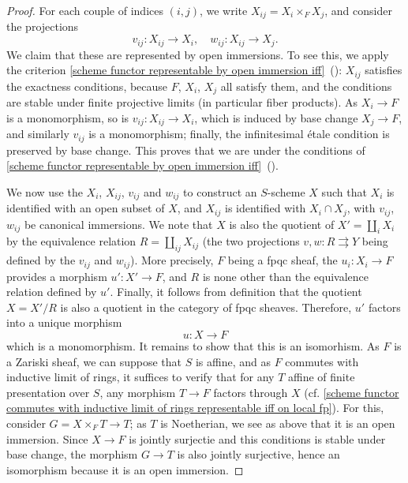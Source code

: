 \begin{proof}
For each couple of indices $(i,j)$, we write $X_{ij}=X_i\times_FX_j$, and consider the projections
\[v_{ij}:X_{ij}\to X_i,\quad w_{ij}:X_{ij}\to X_j.\]
We claim that these are represented by open immersions. To see this, we apply the criterion \cref{scheme functor representable by open immersion iff}~(): $X_{ij}$ satisfies the exactness conditions, because $F$, $X_i$, $X_j$ all satisfy them, and the conditions are stable under finite projective limits (in particular fiber products). As $X_i\to F$ is a monomorphism, so is $v_{ij}:X_{ij}\to X_i$, which is induced by base change $X_j\to F$, and similarly $v_{ij}$ is a monomorphism; finally, the infinitesimal \'etale condition is preserved by base change. This proves that we are under the conditions of \cref{scheme functor representable by open immersion iff}~().\par
We now use the $X_i$, $X_{ij}$, $v_{ij}$ and $w_{ij}$ to construct an $S$-scheme $X$ such that $X_i$ is identified with an open subset of $X$, and $X_{ij}$ is identified with $X_i\cap X_j$, with $v_{ij}$, $w_{ij}$ be canonical immersions. We note that $X$ is also the quotient of $X'=\coprod_iX_i$ by the equivalence relation $R=\coprod_{ij}X_{ij}$ (the two projections $v,w:R\rightrightarrows Y$ being defined by the $v_{ij}$ and $w_{ij}$). More precisely, $F$ being a fpqc sheaf, the $u_i:X_i\to F$ provides a morphism $u':X'\to F$, and $R$ is none other than the equivalence relation defined by $u'$. Finally, it follows from definition that the quotient $X=X'/R$ is also a quotient in the category of fpqc sheaves. Therefore, $u'$ factors into a unique morphism
\[u:X\to F\]
which is a monomorphism. It remains to show that this is an isomorhism. As $F$ is a Zariski sheaf, we can suppose that $S$ is affine, and as $F$ commutes with inductive limit of rings, it suffices to verify that for any $T$ affine of finite presentation over $S$, any morphism $T\to F$ factors through $X$ (cf. \cref{scheme functor commutes with inductive limit of rings representable iff on local fp}). For this, consider $G=X\times_FT\to T$; as $T$ is Noetherian, we see as above that it is an open immersion. Since $X\to F$ is jointly surjectie and this conditions is stable under base change, the morphism $G\to T$ is also jointly surjective, hence an isomorphism because it is an open immersion.
\end{proof}

